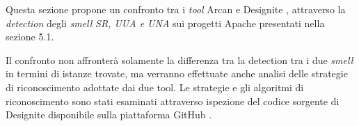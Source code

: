 Questa sezione propone un confronto tra i \textit{tool} Arcan e Designite \cite{Designite} , attraverso la \textit{detection} degli \textit{smell} \textit{SR, UUA e UNA} sui progetti Apache \cite{apache} presentati nella sezione 5.1.

Il confronto non affronterà solamente la differenza tra la detection tra i due \textit{smell} in termini di istanze trovate, ma verranno effettuate anche analisi delle strategie di riconoscimento adottate dai due tool. Le strategie e gli algoritmi di riconoscimento sono stati esaminati attraverso ispezione del codice sorgente di Designite disponibile sulla piattaforma GitHub \cite{designiteGithub}.

